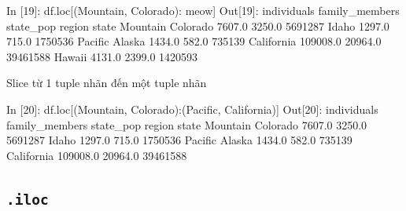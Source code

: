 \documentclass[
]{book}
\newenvironment{Shaded}{\begin{snugshade}}{\end{snugshade}}
\newcommand{\DecValTok}[1]{\textcolor[rgb]{0.00,0.00,0.81}{#1}}
\newcommand{\FloatTok}[1]{\textcolor[rgb]{0.00,0.00,0.81}{#1}}
\newcommand{\NormalTok}[1]{#1}
\newcommand{\StringTok}[1]{\textcolor[rgb]{0.31,0.60,0.02}{#1}}
\begin{document}
\begin{Shaded}
\begin{Highlighting}[]
\NormalTok{In [}\DecValTok{19}\NormalTok{]: df.loc[(}\StringTok{\textquotesingle{}Mountain\textquotesingle{}}\NormalTok{, }\StringTok{\textquotesingle{}Colorado\textquotesingle{}}\NormalTok{): }\StringTok{\textquotesingle{}meow\textquotesingle{}}\NormalTok{]}
\NormalTok{Out[}\DecValTok{19}\NormalTok{]:}
\NormalTok{                     individuals  family\_members  state\_pop}
\NormalTok{region   state                                             }
\NormalTok{Mountain Colorado         }\FloatTok{7607.0}          \FloatTok{3250.0}    \DecValTok{5691287}
\NormalTok{         Idaho            }\FloatTok{1297.0}           \FloatTok{715.0}    \DecValTok{1750536}
\NormalTok{Pacific  Alaska           }\FloatTok{1434.0}           \FloatTok{582.0}     \DecValTok{735139}
\NormalTok{         California     }\FloatTok{109008.0}         \FloatTok{20964.0}   \DecValTok{39461588}
\NormalTok{         Hawaii           }\FloatTok{4131.0}          \FloatTok{2399.0}    \DecValTok{1420593}
\end{Highlighting}
\end{Shaded}

Slice từ 1 tuple nhãn đến một tuple nhãn

\begin{Shaded}
\begin{Highlighting}[]
\NormalTok{In [}\DecValTok{20}\NormalTok{]: df.loc[(}\StringTok{\textquotesingle{}Mountain\textquotesingle{}}\NormalTok{, }\StringTok{\textquotesingle{}Colorado\textquotesingle{}}\NormalTok{):(}\StringTok{\textquotesingle{}Pacific\textquotesingle{}}\NormalTok{, }\StringTok{\textquotesingle{}California\textquotesingle{}}\NormalTok{)]}
\NormalTok{Out[}\DecValTok{20}\NormalTok{]:}
\NormalTok{                     individuals  family\_members  state\_pop}
\NormalTok{region   state                                             }
\NormalTok{Mountain Colorado         }\FloatTok{7607.0}          \FloatTok{3250.0}    \DecValTok{5691287}
\NormalTok{         Idaho            }\FloatTok{1297.0}           \FloatTok{715.0}    \DecValTok{1750536}
\NormalTok{Pacific  Alaska           }\FloatTok{1434.0}           \FloatTok{582.0}     \DecValTok{735139}
\NormalTok{         California     }\FloatTok{109008.0}         \FloatTok{20964.0}   \DecValTok{39461588}
\end{Highlighting}
\end{Shaded}

\hypertarget{iloc}{%
\subsection{\texorpdfstring{\texttt{.iloc}}{.iloc}}\label{iloc}}
\end{document}
